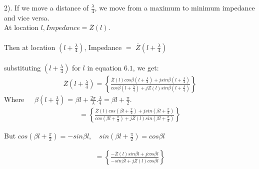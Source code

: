  2).  If we move a distance of $\frac{\lambda}{4}$, we move from a maximum to minimum impedance and vice versa.\\
 
At location $l , Impedance =\overline{Z}(l).$\\\\
 Then at location ${(l+\frac{\lambda}{4})}$, Impedance  $=$ $\overline{Z}(l+\frac{\lambda}{4})$\\\\
  substituting ${(l+\frac{\lambda}{4})}$ for $l$ in equation $6.1$, we get:
\begin{align*}
\overline{Z}(l+\frac{\lambda}{4}) = \left\lbrace \frac{\overline{Z}(l)cos\beta (l+\frac{\lambda}{4}) + jsin\beta (l+\frac{\lambda}{4})}{cos\beta (l+\frac{\lambda}{4}) + j\overline{Z}(l)sin\beta (l+\frac{\lambda}{4})}\right\rbrace 
\end{align*}
 Where\ \ \  $\beta( l + \frac{\lambda}{4})$ = $\beta l + \frac{2\pi}{\lambda} . \frac{\lambda}{4} = \beta l + \frac{\pi}{2}.$
\begin{align*} 
= \left\lbrace \frac{\overline{Z}(l)cos(\beta l + \frac{\pi}{2}) + jsin(\beta l + \frac{\pi}{2})}{cos (\beta l + \frac{\pi}{2}) + j\overline{Z}(l)sin(\beta l + \frac{\pi}{2})}\right\rbrace
\end{align*}

 But $cos(\beta l + \frac{\pi}{2})= -sin\beta l , \quad sin(\beta l +\frac{\pi}{2})= cos\beta l$
 
\begin{align*} 
= \left\lbrace \frac{-\overline{Z}(l)sin\beta l + jcos\beta l}{-sin\beta l + j\overline{Z}(l) cos\beta l}\right\rbrace
\end{align*}
 
